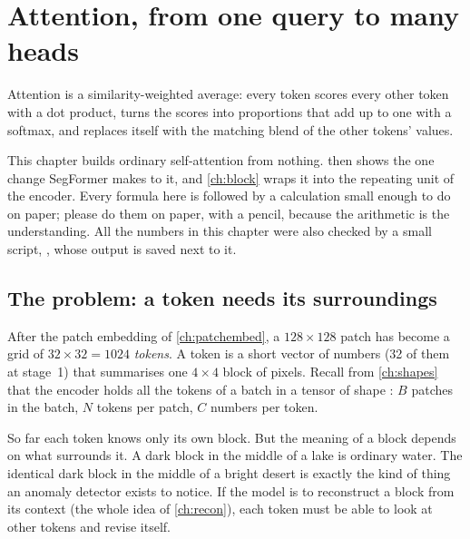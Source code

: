 \chapter{Attention, from one query to many heads}\label{ch:attention}

\begin{onething}
Attention is a similarity-weighted average: every token scores every other token with a dot
product, turns the scores into proportions that add up to one with a softmax, and replaces
itself with the matching blend of the other tokens' values.
\end{onething}

This chapter builds ordinary self-attention from nothing.  then shows the one
change SegFormer makes to it, and \cref{ch:block} wraps it into the repeating unit of the
encoder. Every formula here is followed by a calculation small enough to do on paper; please do
them on paper, with a pencil, because the arithmetic is the understanding. All the numbers in
this chapter were also checked by a small script, ,
whose output is saved next to it.

\section{The problem: a token needs its surroundings}\label{sec:attention:problem}

After the patch embedding of \cref{ch:patchembed}, a $128\times128$ patch has become a grid of
$32\times32 = 1024$ \emph{tokens}. A token is a short vector of numbers (32 of them at
stage~1) that summarises one $4\times4$ block of pixels. Recall from \cref{ch:shapes} that the
encoder holds all the tokens of a batch in a tensor of shape : $B$ patches in the
batch, $N$ tokens per patch, $C$ numbers per token.

So far each token knows only its own block. But the meaning of a block depends on what surrounds
it. A dark block in the middle of a lake is ordinary water. The identical dark block in the middle
of a bright desert is exactly the kind of thing an anomaly detector exists to notice. If the model
is to reconstruct a block from its context (the whole idea of \cref{ch:recon}), each token must be
able to look at other tokens and revise itself.


